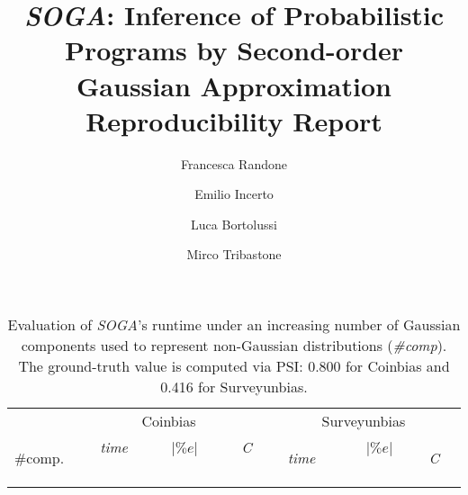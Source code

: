 \documentclass[a4paper]{llncs}
\newcommand{\soga}{\textsl{SOGA}}
\begin{document}
\mainmatter

\title{\soga: Inference of Probabilistic Programs by Second-order Gaussian Approximation Reproducibility Report}


\author{Francesca Randone  \and Emilio Incerto  \and Luca Bortolussi  \and Mirco Tribastone}

\allowdisplaybreaks[0]

\maketitle
\setcounter{table}{3}
\begin{table}[t]
\caption{Evaluation of \soga's runtime under an increasing number of Gaussian components used to represent non-Gaussian distributions (\emph{\#comp}). The ground-truth value is computed via PSI: 0.800 for Coinbias and 0.416 for Surveyunbias.}
\centering
\begin{tabular}{ccccccc}
\toprule
 & \multicolumn{3}{c}{Coinbias} & \multicolumn{3}{c}{Surveyunbias} \\
 \cmidrule(l){2-4}  \cmidrule(l){5-7}
\#comp. & \ \ \emph{time} \ \ & \ \ $|\%e|$ \ \ &\ \  \emph{C} \ \ & \ \ \emph{time}\ \  &\ \  $|\%e|$ \ \ &\ \  \emph{C}\ \   \\
\midrule{%
{{i}} {%
{%
\end{tabular}
\label{tab:sendCmp}
\end{table}
\end{document}
